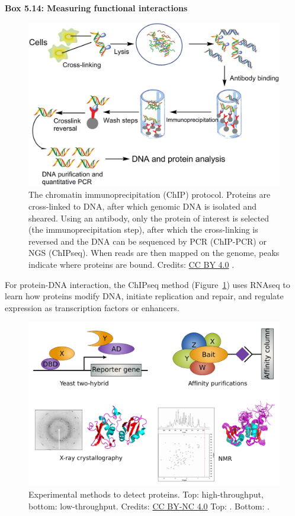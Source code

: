 \begin{framed}
\textbf{Box 5.14: Measuring functional interactions}\\
\begin{figure}[!htbp]
\centering
\includegraphics[width=0.7\linewidth]{files/chip-protocol_alt-a399ea3b54d09e8950dfaf488d2396de.jpg}
\caption[]{The chromatin immunoprecipitation (ChIP) protocol. Proteins are
cross-linked to DNA, after which genomic DNA is isolated and sheared. Using
an antibody, only the protein of interest is selected (the
immunoprecipitation step), after which the cross-linking is reversed and the
DNA can be sequenced by PCR (ChIP-PCR) or NGS (ChIPseq). When reads are then
mapped on the genome, peaks indicate where proteins are bound.
Credits: \href{https://creativecommons.org/licenses/by/4.0/}{CC BY 4.0} \cite{chip_protocol_alt_2015}.}
\label{chip_protocol_alt}
\end{figure}

For protein-DNA interaction, the ChIPseq method
(Figure~\ref{chip_protocol_alt}) uses RNAseq to learn how proteins modify DNA,
initiate replication and repair, and regulate expression as transcription
factors or enhancers.

\begin{figure}[!htbp]
\centering
\includegraphics[width=0.7\linewidth]{files/experimental-protein-ac5d5340137b8cc795b520a62aadbf03.png}
\caption[]{Experimental methods to detect proteins. Top: high-throughput, bottom: low-throughput.
Credits: \href{https://creativecommons.org/licenses/by/4.0/}{CC BY-NC 4.0} Top: \cite{own_5_2024}. Bottom: \cite{experimental_protein_methods_bottom_alt_nd}.}
\label{experimental_protein_methods_alt}
\end{figure}


\end{framed}
